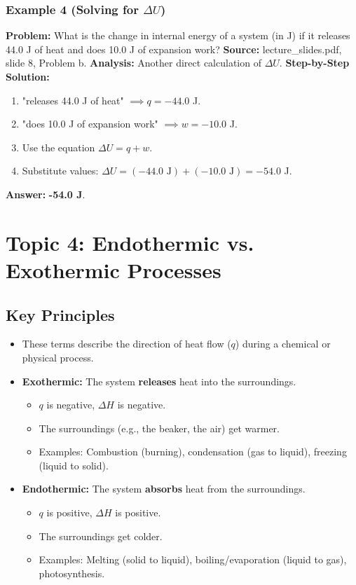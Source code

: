 \documentclass{article}
\begin{document}
\subsubsection{Example 4 (Solving for $\Delta U$)}
\textbf{Problem:} What is the change in internal energy of a system (in J) if it releases 44.0 J of heat and does 10.0 J of expansion work?
\textbf{Source:} lecture\_slides.pdf, slide 8, Problem b.
\textbf{Analysis:} Another direct calculation of $\Delta U$.
\textbf{Step-by-Step Solution:}
\begin{enumerate}
    \item "releases 44.0 J of heat" $\implies q = -44.0$ J.
    \item "does 10.0 J of expansion work" $\implies w = -10.0$ J.
    \item Use the equation $\Delta U = q + w$.
    \item Substitute values: $\Delta U = (-44.0 \text{ J}) + (-10.0 \text{ J}) = -54.0$ J.
\end{enumerate}
\textbf{Answer:} \textbf{-54.0 J}.

\section{Topic 4: Endothermic vs. Exothermic Processes}
\subsection{Key Principles}
\begin{itemize}
    \item These terms describe the direction of heat flow ($q$) during a chemical or physical process.
    \item \textbf{Exothermic:} The system \textbf{releases} heat into the surroundings.
        \begin{itemize}
            \item $q$ is negative, $\Delta H$ is negative.
            \item The surroundings (e.g., the beaker, the air) get warmer.
            \item Examples: Combustion (burning), condensation (gas to liquid), freezing (liquid to solid).
        \end{itemize}
    \item \textbf{Endothermic:} The system \textbf{absorbs} heat from the surroundings.
        \begin{itemize}
            \item $q$ is positive, $\Delta H$ is positive.
            \item The surroundings get colder.
            \item Examples: Melting (solid to liquid), boiling/evaporation (liquid to gas), photosynthesis.
        \end{itemize}
\end{itemize}
\end{document}
